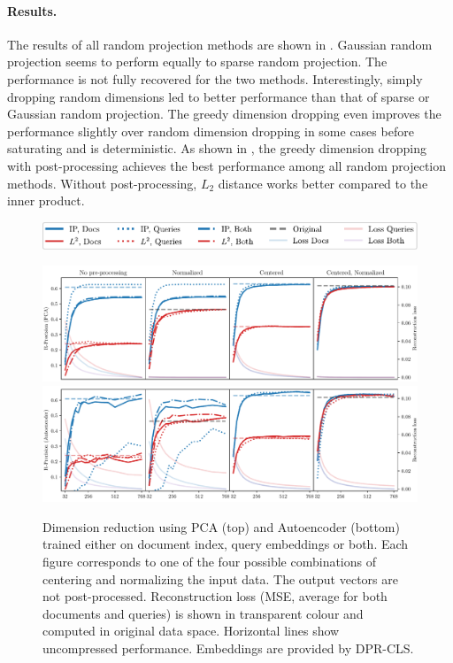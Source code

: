 \paragraph{Results.}

The results of all random projection methods are shown in .
Gaussian random projection seems to perform equally to sparse random projection.
The performance is not fully recovered for the two methods.
Interestingly, simply dropping random dimensions led to better performance than that of sparse or Gaussian random projection.
The greedy dimension dropping even improves the performance slightly over random dimension dropping in some cases before saturating and is deterministic.
As shown in , the greedy dimension dropping with post-processing achieves the best performance among all random projection methods.
Without post-processing, $L_2$ distance works better compared to the inner product. 

\begin{figure}[ht]
    \center
    \includegraphics[width=0.85\linewidth]{img/pca_auto_legend.pdf}
    \vspace{0.3cm}

    \includegraphics[width=\linewidth]{img/pca_main.pdf}\\
    \vspace{-0.12cm}
    \includegraphics[width=\linewidth]{img/auto_main.pdf}

    \caption{Dimension reduction using PCA (top) and Autoencoder (bottom) trained either on document index, query embeddings or both. Each figure corresponds to one of the four possible combinations of centering and normalizing the input data. The output vectors are not post-processed. Reconstruction loss (MSE, average for both documents and queries) is shown in transparent colour and computed in original data space. Horizontal lines show uncompressed performance. Embeddings are provided by DPR-CLS.}
    \label{fig:pca_auto_main}
\end{figure}

